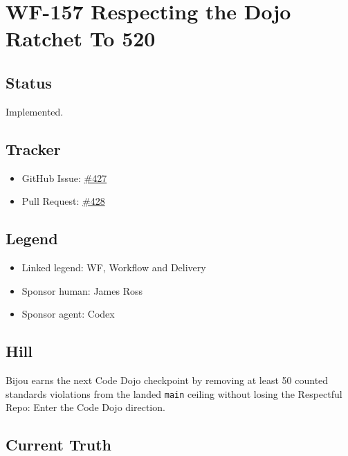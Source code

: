 \chapter{WF-157 Respecting the Dojo Ratchet To 520}\label{record-239}

\smallskip

\section{Status}\label{record-239-status}

Implemented.

\section{Tracker}\label{record-239-tracker}

\begin{itemize}
\tightlist
\item
  GitHub Issue: \href{https://github.com/flyingrobots/bijou/issues/427}{\#427}
\item
  Pull Request: \href{https://github.com/flyingrobots/bijou/pull/428}{\#428}
\end{itemize}

\section{Legend}\label{record-239-legend}

\begin{itemize}
\tightlist
\item
  Linked legend: WF, Workflow and Delivery
\item
  Sponsor human: James Ross
\item
  Sponsor agent: Codex
\end{itemize}

\section{Hill}\label{record-239-hill}

Bijou earns the next Code Dojo checkpoint by removing at least 50 counted standards violations from the landed \texttt{m\allowbreak{}a\allowbreak{}i\allowbreak{}n} ceiling without losing the Respectful Repo: Enter the Code Dojo direction.

\section{Current Truth}\label{record-239-current-truth}

